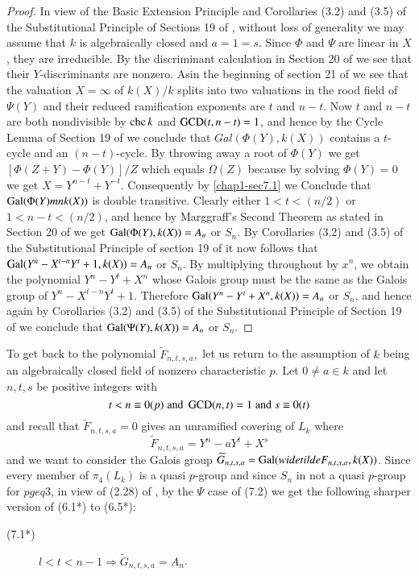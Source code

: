 \begin{proof} In view of the Basic Extension Principle and Corollaries (3.2) and (3.5) of the Substitutional Principle of Sections 19 of \cite{chap1-key8}, without loss of generality we may assume that $k$ is algebraically closed and $a=1 =s$. Since $\Phi$ and $\Psi$ are linear in $X$, they are irreducible. By the discriminant calculation in Section 20 of \cite{chap1-key8} we see that their $Y$-discriminants are nonzero. As\pageoriginale in the beginning of section 21 of \cite{chap1-key8} we see that the valuation $X=\infty$ of $k(X)/k$ splits into two valuations in the rood field of $\Psi(Y)$ and their reduced  ramification exponents are $t$ and $n-t$. Now $t$ and $n-t$ are both nondivisible by $\operatorname{chc} k$ and $\operatorname{GCD}(t,n-t)=1$, and hence by the Cycle Lemma of Section 19 of \cite{chap1-key8} we conclude that $Gal(\Phi(Y), k(X))$ contains a $t$-cycle and an $(n-t)$-cycle. By throwing away a root of $\Phi(Y)$ we get $\left[\Phi(Z+Y)-\Phi(Y)\right]/Z$ which equals $\Omega(Z)$ because by solving $\Phi(Y)=0$ we get $X=Y^{n-t}+Y^{-t}$. Consequently by \eqref{chap1-sec7.1} we Conclude that $\operatorname{Gal}(\Phi(Y)mn k(X))$ is double transitive. Clearly either $1<t<(n/2)$ or $1<n-t<(n/2)$, and hence by Marggraff's Second Theorem as stated in Section 20 of \cite{chap1-key8} we get $\operatorname{Gal}(\Phi(Y), k(X)) = A_{n}$ or $S_{n}$. By Corollaries (3.2) and (3.5) of the Substitutional Principle of section 19 of \cite{chap1-key8} it now follows that $\operatorname{Gal}(Y^{n}-X^{t-n}Y^{t}+1, k(X))=A_{n}$ or $S_{n}$. By multiplying throughout by $x^{n}$, we obtain the polynomial $Y^{n}-Y^{t}+X^{n}$ whose Galois group must be the same as the Galois group of $Y^{n}-X^{t-n}Y^{t}+1$. Therefore $\operatorname{Gal}(Y^{n}-Y^{t}+X^{n}, k(X))=A_{n}$ or $S_{n}$, and hence again by Corollaries (3.2) and (3.5) of the Substitutional Principle of Section 19 of \cite{chap1-key8} we conclude that $\operatorname{Gal}(\Psi(Y), k(X)) =A_{n}$ or $S_{n}$.  
\end{proof}

To get back to the polynomial $\widetilde{F}_{n,t,s,a},$ let us return to the assumption of $k$ being an algebraically closed field of nonzero characteristic $p$. Let $0\neq a \in k$ and let $n, t, s$ be positive integers with
$$
t < n \equiv 0(p)\; {\rm and}\; \operatorname{GCD}(n,t) = 1\; {\rm and}\; s\equiv 0(t)
$$
and recall that $\widetilde{F}_{n,t,s,a} = 0$ gives an unramified covering of $L_{k}$ where
$$
\widetilde{F}_{n,t,s,a} =Y^{n}-aY^{t}+X^{s}
$$
and we want to consider the Galois group $\widetilde{G}_{n,t,s,a} = \Gal(widetilde{F}_{n,t,s,a},\break k(X))$. Since every member of $\pi_{4}(L_{k})$ is a quasi $p$-group and since $S_{n}$ in not a quasi $p$-group for $p geq 3$, in view of (2.28) of \cite{chap1-key14}, by the $\Psi$ case of (7.2) we get the following sharper version of (6.1*) to (6.5*):
\begin{description}
\item[{\rm (7.1*)}] $l < t < n-1 \Rightarrow \widetilde{G}_{n,t,s,a} =A_{n}$.
\end{description}

